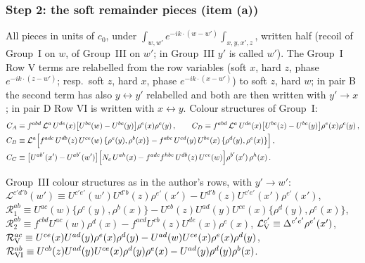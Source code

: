 \documentclass[10pt]{article}
\begin{document}
\subsubsection{Step 2: the soft remainder pieces (item (a))}
\noindent All pieces in units of $c_{0}$, under $\int_{w,w'}e^{-ik\cdot(w-w')}\int_{x,y,x',z}$, written half (recoil of Group~I on $w$, of Group~III on $w'$; in Group~III $y'$ is called $w'$). The Group~I Row V terms are relabelled from the row variables (soft $x$, hard $z$, phase $e^{-ik\cdot(z-w')}$; resp.\ soft $z$, hard $x$, phase $e^{-ik\cdot(x-w')}$) to soft $z$, hard $w$; in pair B the second term has also $y\leftrightarrow y'$ relabelled and both are then written with $y'\to x$; in pair D Row VI is written with $x\leftrightarrow y$. Colour structures of Group~I:
\begin{align}
C_{A}&\equiv f^{abd}\,\mathcal{L}^{a}\,U^{de}(x)\big[U^{bc}(w)-U^{bc}(y)\big]\rho^{e}(x)\rho^{c}(y)\,,\qquad
C_{D}\equiv f^{abd}\,\mathcal{L}^{a}\,U^{de}(x)\big[U^{bc}(z)-U^{bc}(y)\big]\rho^{e}(x)\rho^{c}(y)\,,\notag\\
C_{B}&\equiv \mathcal{L}^{a}\Big[f^{adc}\,U^{db}(z)\,U^{ce}(w)\,\{\rho^{e}(y),\rho^{b}(x)\}-f^{abc}\,U^{cd}(y)\,U^{be}(x)\,\{\rho^{d}(y),\rho^{e}(x)\}\Big]\,,\label{sf:col}\\
C_{C}&\equiv\big[U^{ab'}(x')-U^{ab'}(w')\big]\Big[N_{c}\,U^{ah}(x)-f^{adc}f^{hbe}\,U^{db}(z)\,U^{ce}(w)\Big]\rho^{b'}(x')\,\rho^{h}(x)\,.\notag
\end{align}
{\sloppy Group~III colour structures as in the author's rows, with $y'\to w'$: $\mathcal{L}^{c'd'b}(w')\equiv U^{c'e'}(w')U^{d'b}(z)\rho^{e'}(x')-U^{d'b}(z)U^{c'e'}(x')\rho^{e'}(x')$, $\mathcal{R}_{1}^{ab}\equiv U^{ac}(w)\{\rho^{c}(y),\rho^{b}(x)\}-U^{cb}(z)U^{ad}(y)U^{ce}(x)\{\rho^{d}(y),\rho^{e}(x)\}$, $\mathcal{R}_{2}^{ab}\equiv f^{cbd}U^{ac}(w)\rho^{d}(x)-f^{acd}U^{cb}(z)U^{de}(x)\rho^{e}(x)$, $\mathcal{L}_{\rm V}^{c'}\equiv\Delta^{c'e'}\rho^{e'}(x')$, $\mathcal{R}_{\rm V}^{ac}\equiv U^{ce}(x)U^{ad}(y)\rho^{e}(x)\rho^{d}(y)-U^{ad}(w)U^{ce}(x)\rho^{e}(x)\rho^{d}(y)$, $\mathcal{R}_{\rm VI}^{ab}\equiv U^{cb}(z)U^{ad}(y)U^{ce}(x)\rho^{d}(y)\rho^{e}(x)-U^{ad}(y)\rho^{d}(y)\rho^{b}(x)$.\par}
\end{document}
